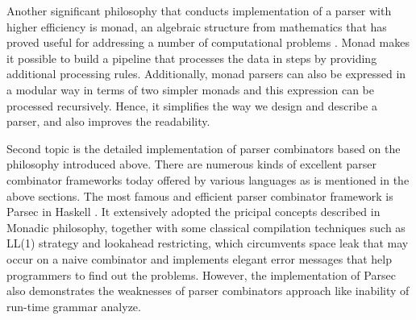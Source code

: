 \documentclass[9pt,a4paper,twocolumn]{article}
\begin{document}
Another significant philosophy that conducts implementation of a parser with higher efficiency is monad, an algebraic structure from mathematics that has proved useful for addressing a number of computational problems \cite{Hutton:1996}. Monad makes it possible to build a pipeline that processes the data in steps by providing additional processing rules. Additionally, monad parsers can also be expressed in a modular way in terms of two simpler monads and this expression can be processed recursively. Hence, it simplifies the way we design and describe a parser, and also improves the readability.

Second topic is the detailed implementation of parser combinators based on the philosophy introduced above. There are numerous kinds of excellent parser combinator frameworks today offered by various languages as is mentioned in the above sections. The most famous and efficient parser combinator framework is Parsec in Haskell \cite{Fokker:1995}. It extensively adopted the pricipal concepts described in Monadic philosophy, together with some classical compilation techniques such as LL(1) strategy and lookahead restricting, which circumvents space leak that may occur on a naive combinator and implements elegant error messages that help programmers to find out the problems. However, the implementation of Parsec also demonstrates the weaknesses of parser combinators approach like inability of run-time grammar analyze.
\end{document}
